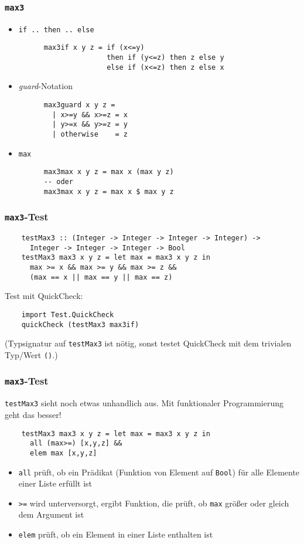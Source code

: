 \documentclass{beamer}
\begin{document}
\begin{frame}[fragile]
  \frametitle{\lstinline{max3}}
  \begin{itemize}
  \item \lstinline{if .. then .. else}
    \pause
    \begin{lstlisting}
      max3if x y z = if (x<=y)
                     then if (y<=z) then z else y
                     else if (x<=z) then z else x
    \end{lstlisting}
    \pause
  \item \emph{guard}-Notation
    \pause
    \begin{lstlisting}
      max3guard x y z =
        | x>=y && x>=z = x
        | y>=x && y>=z = y
        | otherwise    = z
    \end{lstlisting}
    \pause
  \item \lstinline{max}
    \pause
    \begin{lstlisting}
      max3max x y z = max x (max y z)
      -- oder
      max3max x y z = max x $ max y z
    \end{lstlisting}
  \end{itemize}
\end{frame}

\begin{frame}[fragile]
  \frametitle{\lstinline{max3}-Test}
  \begin{lstlisting}
    testMax3 :: (Integer -> Integer -> Integer -> Integer) ->
      Integer -> Integer -> Integer -> Bool
    testMax3 max3 x y z = let max = max3 x y z in
      max >= x && max >= y && max >= z &&
      (max == x || max == y || max == z)
  \end{lstlisting}
  \pause
  Test mit QuickCheck:
  \begin{lstlisting}
    import Test.QuickCheck
    quickCheck (testMax3 max3if)
  \end{lstlisting}
  (Typsignatur auf \lstinline{testMax3} ist nötig, sonst testet QuickCheck mit dem trivialen Typ/Wert \lstinline{()}.)
\end{frame}

\begin{frame}[fragile]
  \frametitle{\lstinline{max3}-Test}
  \lstinline{testMax3} sieht noch etwas unhandlich aus.
  Mit funktionaler Programmierung geht das besser!
  \pause
  \begin{lstlisting}
    testMax3 max3 x y z = let max = max3 x y z in
      all (max>=) [x,y,z] &&
      elem max [x,y,z]
  \end{lstlisting}
  \begin{itemize}
  \item \lstinline{all} prüft, ob ein Prädikat (Funktion von Element auf \lstinline{Bool}) für alle Elemente einer Liste erfüllt ist
  \item \lstinline{>=} wird unterversorgt, ergibt Funktion, die prüft, ob \lstinline{max} größer oder gleich dem Argument ist
  \item \lstinline{elem} prüft, ob ein Element in einer Liste enthalten ist
  \end{itemize}
\end{frame}
\end{document}

